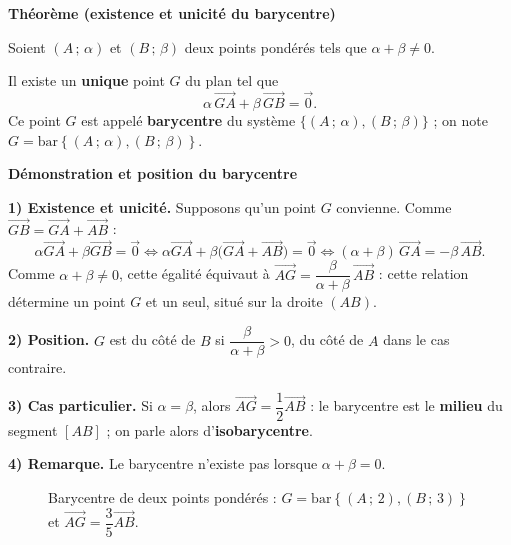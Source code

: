 \documentclass[10pt,a4paper]{article}
\newcommand{\vc}[1]{\overrightarrow{#1}}                     %
\newcommand{\barG}[1]{\mathrm{bar}\left\{#1\right\}}          %
\newenvironment{encadre}[3][10]{%
  \par\needspace{#1\baselineskip}\addvspace{6pt}\noindent
  \def\encColor{#2}%
  \begin{lrbox}{\encbox}%
  \begin{minipage}{\dimexpr\linewidth-2\fboxsep-2\fboxrule-0.5pt\relax}%
  \raggedright{\color{#2}\bfseries #3}\par\smallskip}%
  {\end{minipage}\end{lrbox}%
  \noindent\fcolorbox{\encColor}{\encColor!7}{\usebox{\encbox}}\par\addvspace{6pt}}
\begin{document}
\begin{encadre}[10]{cProp}{Théorème (existence et unicité du barycentre)}
Soient $(A\,;\,\alpha)$ et $(B\,;\,\beta)$ deux points pondérés tels que $\alpha+\beta\neq 0$.\par
Il existe un \textbf{unique} point $G$ du plan tel que
\[
\alpha\,\vc{GA}+\beta\,\vc{GB}=\vc{0}.
\]
Ce point $G$ est appelé \textbf{barycentre} du système $\bigl\{(A\,;\,\alpha),(B\,;\,\beta)\bigr\}$ ; on note $G=\barG{(A\,;\,\alpha),(B\,;\,\beta)}$.
\end{encadre}

\begin{encadre}[16]{cMeth}{Démonstration et position du barycentre}
\textbf{1) Existence et unicité.} Supposons qu'un point $G$ convienne. Comme $\vc{GB}=\vc{GA}+\vc{AB}$ :
\[
\alpha\vc{GA}+\beta\vc{GB}=\vc{0}\Longleftrightarrow \alpha\vc{GA}+\beta\bigl(\vc{GA}+\vc{AB}\bigr)=\vc{0}\Longleftrightarrow (\alpha+\beta)\,\vc{GA}=-\beta\,\vc{AB}.
\]
Comme $\alpha+\beta\neq 0$, cette égalité équivaut à $\vc{AG}=\dfrac{\beta}{\alpha+\beta}\,\vc{AB}$ : cette relation détermine un point $G$ et un seul, situé sur la droite $(AB)$.\par
\textbf{2) Position.} $G$ est du côté de $B$ si $\dfrac{\beta}{\alpha+\beta}>0$, du côté de $A$ dans le cas contraire.\par
\textbf{3) Cas particulier.} Si $\alpha=\beta$, alors $\vc{AG}=\dfrac{1}{2}\vc{AB}$ : le barycentre est le \textbf{milieu} du segment $[AB]$ ; on parle alors d'\textbf{isobarycentre}.\par
\textbf{4) Remarque.} Le barycentre n'existe pas lorsque $\alpha+\beta=0$.
\end{encadre}

\begin{figure}[htbp]
\centering
\caption{Barycentre de deux points pondérés : $G=\barG{(A\,;\,2),(B\,;\,3)}$ et $\vc{AG}=\dfrac{3}{5}\vc{AB}$.}
\end{figure}
\end{document}
